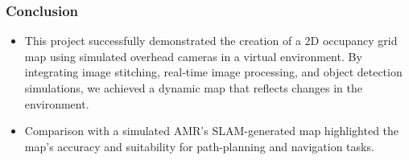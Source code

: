 \documentclass{beamer}
\begin{document}
\begin{frame}
  \frametitle{Conclusion}
  \begin{itemize}
    \item This project successfully demonstrated the creation of a 2D occupancy grid map using simulated overhead cameras in a virtual environment. By integrating image stitching, real-time image processing, and object detection simulations, we achieved a dynamic map that reflects changes in the environment.
    \item Comparison with a simulated AMR's SLAM-generated map highlighted the map's accuracy and suitability for path-planning and navigation tasks. 
    \end{itemize}
\end{frame}
\end{document}
